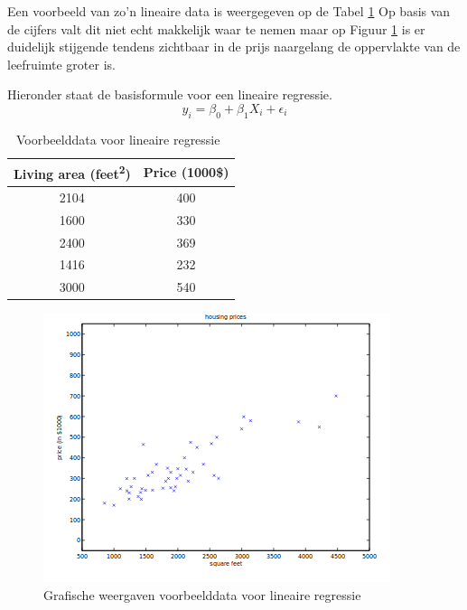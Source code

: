 Een voorbeeld van zo'n lineaire data is weergegeven op de Tabel \ref{Tab:Tcr} Op basis van de cijfers valt dit niet echt makkelijk waar te nemen maar op Figuur \ref{fig:ExampleDataLinearRegressionGraph} is er duidelijk stijgende tendens zichtbaar in de prijs naargelang de oppervlakte van de leefruimte groter is.

Hieronder staat de basisformule voor een lineaire regressie. 
\begin{equation}
y_i = \beta_0 + \beta_1 X_i + \epsilon_i
\end{equation}



\begin{table}[ht]
    \caption{Voorbeelddata voor lineaire regressie~\autocite{Pant2019}}
    \centering
    \begin{tabular}{|c|c|} 
        \hline     
        Living area (feet\textsuperscript{2}) & Price (1000\$) \\ [0.5ex] 
        \hline\hline
        2104 & 400 \\  [0.3ex]
        \hline
        1600 & 330 \\ [0.3ex]
        \hline
        2400 & 369 \\ [0.3ex]
        \hline
        1416 & 232 \\ [0.3ex]
        \hline
        3000 & 540 \\ [0.3ex]
        \hline
    \end{tabular}
    \label{Tab:Tcr}
\end{table}



\begin{figure}[!h]
    \centering
    \caption{Grafische weergaven voorbeelddata voor lineaire regressie~\autocite{Pant2019}}
    \label{fig:ExampleDataLinearRegressionGraph}
    \includegraphics[width=0.7\linewidth]{ExampleDataLinearRegressionGraph}
\end{figure}


